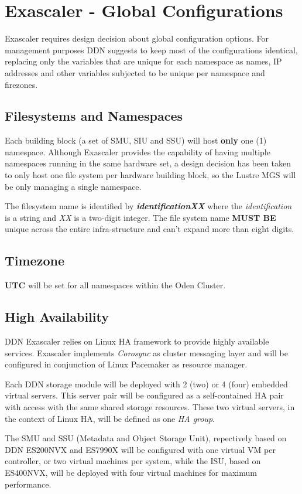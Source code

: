 \documentclass{article}
\begin{document}
\section{Exascaler - Global Configurations}
Exascaler requires design decision about global configuration options. For management purposes DDN suggests to keep most of the configurations identical, replacing only the variables that are unique for each namespace as names, IP addresses and other variables subjected to be unique per namespace and firezones.

\subsection{Filesystems and Namespaces}
Each building block (a set of SMU, SIU and SSU) will host \textbf{only} one (1) namespace. Although Exascaler provides the capability of having multiple namespaces running in the same hardware set, a design decision has been taken to only host one file system per hardware building block, so the Lustre MGS will be only managing a single namespace. 

The filesystem name is identified by \textbf{\textit{identificationXX}} where the \textit{identification} is a string and \textit{XX} is a two-digit integer. The file system name \textbf{MUST BE} unique across the entire infra-structure and can't expand more than eight digits.

\subsection{Timezone}
\textbf{UTC} will be set for all namespaces within the Oden Cluster.

\subsection{High Availability}
DDN Exascaler relies on Linux HA framework to provide highly available services. Exascaler implements \textit{Corosync} as cluster messaging layer and will be configured in conjunction of Linux Pacemaker as resource manager.

Each DDN storage module will be deployed with 2 (two) or 4 (four) embedded virtual servers. This server pair will be configured as a self-contained HA pair with access with the same shared storage resources. These two virtual servers, in the context of Linux HA, will be defined as one \textit{HA group}. 

The SMU and SSU (Metadata and Object Storage Unit), repectively based on DDN ES200NVX and ES7990X will be configured with one virtual VM per controller, or two virtual machines per system, while the ISU, based on ES400NVX, will be deployed with four virtual machines for maximum performance. 
\end{document}
